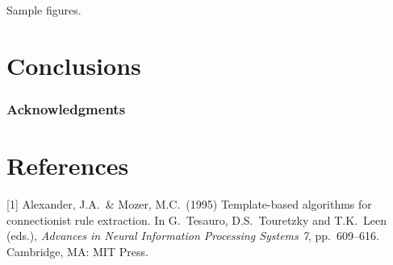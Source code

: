 \documentclass{article}
\begin{document}
\begin{figure}[!htp]
\begin{minipage}{.45\textwidth}
		\label{fig:vnprss_high_fitscore_curve_apoe}
	\end{minipage}%
\end{figure}

Sample figures.

\section{Conclusions}

\subsubsection*{Acknowledgments}


\section*{References}
\small

[1] Alexander, J.A.\ \& Mozer, M.C.\ (1995) Template-based algorithms
for connectionist rule extraction. In G.\ Tesauro, D.S.\ Touretzky and
T.K.\ Leen (eds.), {\it Advances in Neural Information Processing
  Systems 7}, pp.\ 609--616. Cambridge, MA: MIT Press.
\end{document}

